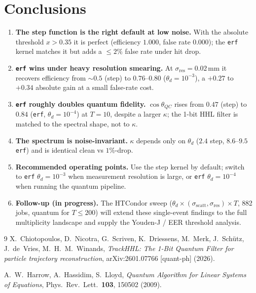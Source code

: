\documentclass[11pt,a4paper]{article}
\newcommand{\thd}{\theta_d}
\newcommand{\sres}{\sigma_{\mathrm{res}}}
\newcommand{\sscat}{\sigma_{\mathrm{scatt}}}
\newcommand{\ntrk}{T}
\newcommand{\cosQC}{\cos\theta_{QC}}
\begin{document}
\section{Conclusions}
\label{sec:conclusions}

\begin{enumerate}
  \item \textbf{The step function is the right default at low noise.} With the absolute
        threshold $x>0.35$ it is perfect (efficiency $1.000$, false rate $0.000$); the
        \texttt{erf} kernel matches it but adds a $\le2\%$ false rate under hit drop.
  \item \textbf{\texttt{erf} wins under heavy resolution smearing.} At
        $\sres=0.02\,\mathrm{mm}$ it recovers efficiency from $\sim\!0.5$ (step) to
        $0.76$--$0.80$ ($\thd=10^{-3}$), a $+0.27$ to $+0.34$ absolute gain at a small
        false-rate cost.
  \item \textbf{\texttt{erf} roughly doubles quantum fidelity.} $\cosQC$ rises from
        $0.47$ (step) to $0.84$ (\texttt{erf}, $\thd=10^{-4}$) at $\ntrk=10$, despite a
        larger $\kappa$; the 1-bit HHL filter is matched to the spectral shape, not to
        $\kappa$.
  \item \textbf{The spectrum is noise-invariant.} $\kappa$ depends only on $\thd$
        ($2.4$ step, $8.6$--$9.5$ \texttt{erf}) and is identical clean vs $1\%$-drop.
  \item \textbf{Recommended operating points.} Use the step kernel by default; switch to
        \texttt{erf} $\thd=10^{-3}$ when measurement resolution is large, or
        \texttt{erf} $\thd=10^{-4}$ when running the quantum pipeline.
  \item \textbf{Follow-up (in progress).} The HTCondor sweep
        ($\thd\times(\sscat,\sres)\times\ntrk$, 882 jobs, quantum for $\ntrk\le200$) will
        extend these single-event findings to the full multiplicity landscape and supply
        the Youden-J / EER threshold analysis.
\end{enumerate}

\begin{thebibliography}{9}
  X.~Chiotopoulos, D.~Nicotra, G.~Scriven, K.~Driessens, M.~Merk,
  J.~Sch\"{u}tz, J.~de~Vries, M.~H.~M.~Winands,
  \textit{TrackHHL: The 1-Bit Quantum Filter for particle trajectory reconstruction},
  arXiv:2601.07766 [quant-ph] (2026).

  A.~W.~Harrow, A.~Hassidim, S.~Lloyd,
  \textit{Quantum Algorithm for Linear Systems of Equations},
  Phys.\ Rev.\ Lett.\ \textbf{103}, 150502 (2009).
\end{thebibliography}
\end{document}
